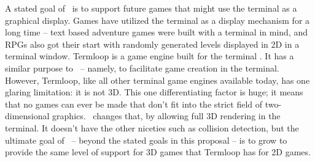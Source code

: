 
A stated goal of \name\ is to support future games that might use the terminal as a graphical display.
Games have utilized the terminal as a display mechanism for a long time -- text based adventure games were built with a terminal in mind, and RPGs also got their start with randomly generated levels displayed in 2D in a terminal window.
Termloop is a game engine built for the terminal \cite{termloop}.
It has a similar purpose to \name\ -- namely, to facilitate game creation in the terminal.
However, Termloop, like all other terminal game engines available today, has one glaring limitation: it is not 3D.
This one differentiating factor is huge; it means that no games can ever be made that don't fit into the strict field of two-dimensional graphics.
\name\ changes that, by allowing full 3D rendering in the terminal.
It doesn't have the other niceties such as collision detection, but the ultimate goal of \name\ -- beyond the stated goals in this proposal -- is to grow to provide the same level of support for 3D games that Termloop has for 2D games.
